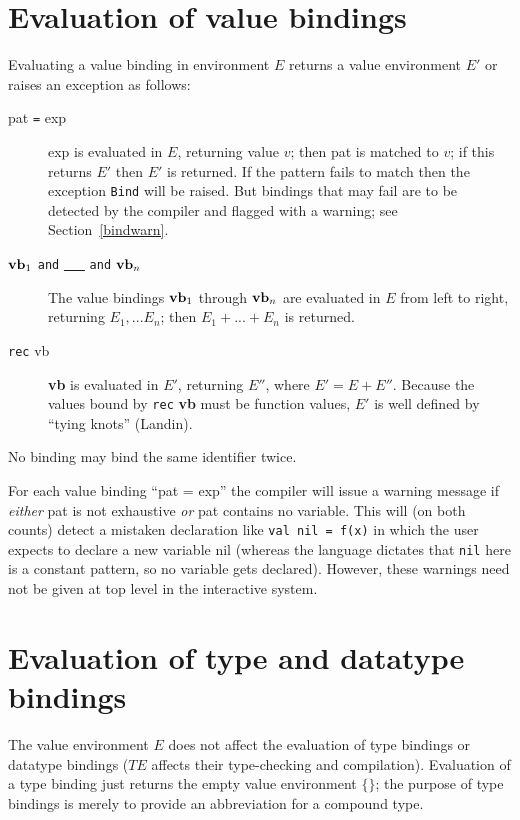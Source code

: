 \section{Evaluation of value bindings}
Evaluating a value binding in environment $E$ returns a value
environment $E'$  or raises an exception as follows:
\begin{description}
\item[pat \verb"=" exp\hfill]  exp is evaluated in $E$, returning value
$v$; then pat is matched to $v$; if this returns $E'$ then $E'$ is
returned.  If the pattern fails to match then the exception 
\verb"Bind" will be raised.
\label{raisebind}
But bindings that may fail are to be detected by the
compiler and flagged with a warning; see Section~\ref{bindwarn}.

\item[${\bf vb}_1$ \verb"and" \underline{\ \ \ } \verb"and" ${\bf vb}_n$\hfill]
The value bindings ${\bf vb}_1$ through ${\bf vb}_n$ are evaluated in
$E$ from left to right, returning $E_1 , ... E_n$; then $E_1 + ... +
E_n$ is returned.

\item[\verb"rec" vb\hfill]  {\bf vb} is evaluated in $E'$, returning $E''$,
where $E' = E + E''$.  Because the values bound by \verb"rec" {\bf
vb} must be function values, $E'$ is well defined by ``tying knots''
(Landin).
\end{description}
No binding may bind the same identifier twice.

\label{bindwarn}
For each value binding ``pat = exp'' the compiler will issue a
warning message if {\it either} pat is not exhaustive {\it or} pat
contains no variable.  This will (on both counts) detect a mistaken
declaration like \verb"val nil = f(x)" in which the user expects to
declare a new variable nil (whereas the language dictates that
\verb"nil" here is a constant pattern, so no variable gets declared).
However, these warnings need not be given at top level in the
interactive system.
\section{Evaluation of type and datatype bindings}
The value environment $E$ does not affect the evaluation of type
bindings or datatype bindings ($TE$ affects their type-checking and
compilation).  Evaluation of a type binding just returns the empty
value environment $\{\}$; the purpose of type bindings is merely to
provide an abbreviation for a compound type.

